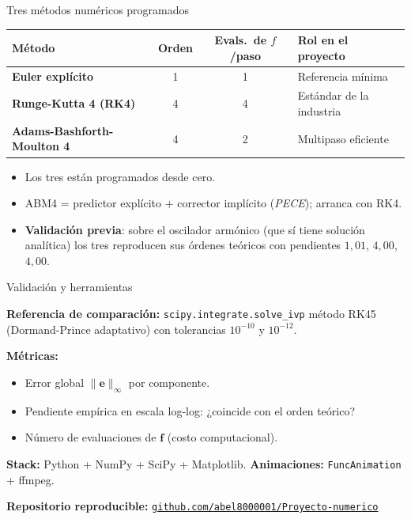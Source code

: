 \documentclass[10pt,aspectratio=169]{beamer}
\begin{document}
\begin{frame}{Tres métodos numéricos programados}

\centering
\small
\begin{tabular}{lccl}
\toprule
\textbf{Método} & \textbf{Orden} & \textbf{Evals.\ de $f$/paso} & \textbf{Rol en el proyecto} \\
\midrule
\textbf{\color{tcpblue}Euler explícito} & 1 & 1 & Referencia mínima \\[0.3em]
\textbf{\color{redred}Runge-Kutta 4 (RK4)} & 4 & 4 & Estándar de la industria \\[0.3em]
\textbf{\color{abmgreen}Adams-Bashforth-Moulton 4} & 4 & 2 & Multipaso eficiente \\
\bottomrule
\end{tabular}

\vspace{1em}
\begin{itemize}
\item Los tres están programados desde cero.
\item ABM4 = predictor explícito + corrector implícito (\textit{PECE}); arranca con RK4.
\item \textbf{Validación previa}: sobre el oscilador armónico (que sí tiene solución analítica)
los tres reproducen sus órdenes teóricos con pendientes $1{,}01$, $4{,}00$, $4{,}00$.
\end{itemize}
\end{frame}

\begin{frame}{Validación y herramientas}

\textbf{Referencia de comparación:} \texttt{scipy.integrate.solve\_ivp}
método RK45 (Dormand-Prince adaptativo) con tolerancias
$10^{-10}$ y $10^{-12}$.

\vspace{0.5em}
\textbf{Métricas:}
\begin{itemize}
\item Error global $\|\mathbf{e}\|_\infty$ por componente.
\item Pendiente empírica en escala log-log: ¿coincide con el orden teórico?
\item Número de evaluaciones de $\mathbf{f}$ (costo computacional).
\end{itemize}

\vspace{0.6em}
\textbf{Stack:} Python + NumPy + SciPy + Matplotlib.
\textbf{Animaciones:} \texttt{FuncAnimation} + ffmpeg.

\vspace{0.6em}
\textbf{Repositorio reproducible:}
\centering
\href{https://github.com/abel8000001/Proyecto-numerico}{\texttt{github.com/abel8000001/Proyecto-numerico}}
\end{frame}
\end{document}
